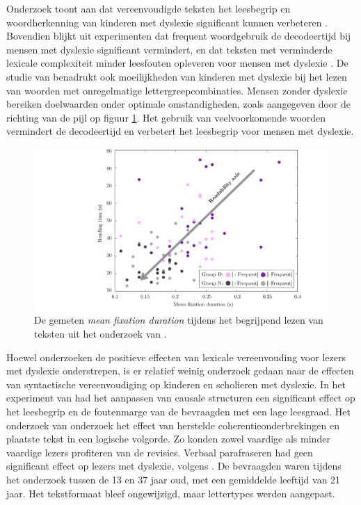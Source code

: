 Onderzoek toont aan dat vereenvoudigde teksten het leesbegrip en woordherkenning van kinderen met dyslexie significant kunnen verbeteren \autocite{RiveroContreras2021}. Bovendien blijkt uit experimenten dat frequent woordgebruik de decodeertijd bij mensen met dyslexie significant vermindert, en dat teksten met verminderde lexicale complexiteit minder leesfouten opleveren voor mensen met dyslexie \autocite{Rello2013a, Gala2016}. De studie van \textcite{Gala2016} benadrukt ook moeilijkheden van kinderen met dyslexie bij het lezen van woorden met onregelmatige lettergreepcombinaties. Mensen zonder dyslexie bereiken doelwaarden onder optimale omstandigheden, zoals aangegeven door de richting van de pijl op figuur \ref{img:readability-mean-fixation-duration}. Het gebruik van veelvoorkomende woorden vermindert de decodeertijd en verbetert het leesbegrip voor mensen met dyslexie.

\medspace

\begin{figure}
\includegraphics[width=\linewidth]{img/readability-mean-fixation-duration.png}
\caption{De gemeten \textit{mean fixation duration} tijdens het begrijpend lezen van teksten uit het onderzoek van \textcite{Rello2013a}.}
\label{img:readability-mean-fixation-duration}
\end{figure}

\medspace

Hoewel onderzoeken de positieve effecten van lexicale vereenvouding voor lezers met dyslexie onderstrepen, is er relatief weinig onderzoek gedaan naar de effecten van syntactische vereenvoudiging op kinderen en scholieren met dyslexie. In het experiment van \textcite{Linderholm2000} had het aanpassen van causale structuren een significant effect op het leesbegrip en de foutenmarge van de bevraagden met een lage leesgraad. Het onderzoek van \textcite{Leroy2013} onderzoek het effect van herstelde coherentieonderbrekingen en plaatste tekst in een logische volgorde. Zo konden zowel vaardige als minder vaardige lezers profiteren van de revisies. Verbaal parafraseren had geen significant effect op lezers met dyslexie, volgens \textcite{Rello2013c}. De bevraagden waren tijdens het onderzoek tussen de 13 en 37 jaar oud, met een gemiddelde leeftijd van 21 jaar. Het tekstformaat bleef ongewijzigd, maar lettertypes werden aangepast.

